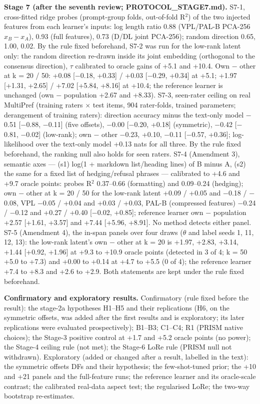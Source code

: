 \documentclass{article}
\begin{document}
\textbf{Stage 7 (after the seventh review; PROTOCOL\_STAGE7.md).} S7-1, cross-fitted ridge probes (prompt-group folds, out-of-fold R$^2$) of the two injected features from each learner's inputs: log length ratio 0.88 (VPL/PAL-B PCA-256 \(x_B - x_A\)), 0.93 (full features), 0.73 (D/DL joint PCA-256); random direction 0.65, 1.00, 0.02. By the rule fixed beforehand, S7-2 was run for the low-rank latent only: the random direction re-drawn inside its joint embedding (orthogonal to the consensus direction), $\tau$ calibrated to oracle gains of +5.1 and +10.4. Own $-$ other at k = 20 / 50: +0.08 {[}$-$0.18, +0.33{]} / +0.03 {[}$-$0.29, +0.34{]} at +5.1; +1.97 {[}+1.31, +2.65{]} / +7.02 {[}+5.84, +8.16{]} at +10.4; the reference learner is unchanged (own $-$ population +2.67 and +8.33). S7-3, seen-rater ceiling on real MultiPref (training raters $\times$ test items, 904 rater-folds, trained parameters; derangement of training raters): direction accuracy minus the text-only model $-$0.51 {[}$-$0.88, $-$0.11{]} (five offsets), $-$0.00 {[}$-$0.20, +0.18{]} (symmetric), $-$0.42 {[}$-$0.81, $-$0.02{]} (low-rank); own $-$ other $-$0.23, +0.10, $-$0.11 {[}$-$0.57, +0.36{]}; log-likelihood over the text-only model +0.13 nats for all three. By the rule fixed beforehand, the ranking null also holds for seen raters. S7-4 (Amendment 3), semantic axes --- (s1) log(1 + markdown list/heading lines) of B minus A, (s2) the same for a fixed list of hedging/refusal phrases --- calibrated to +4.6 and +9.7 oracle points: probes R$^2$ 0.37--0.66 (formatting) and 0.09--0.24 (hedging); own $-$ other at k = 20 / 50 for the low-rank latent +0.09 / +0.05 and $-$0.18 / $-$0.08, VPL $-$0.05 / +0.04 and +0.03 / +0.03, PAL-B (compressed features) $-$0.24 / $-$0.12 and +0.27 / +0.40 {[}$-$0.02, +0.85{]}; reference learner own $-$ population +2.57 {[}+1.61, +3.57{]} and +7.44 {[}+5.96, +8.91{]}. No method detects either panel. S7-5 (Amendment 4), the in-span panels over four draws ($\theta$ and label seeds 1, 11, 12, 13): the low-rank latent's own $-$ other at k = 20 is +1.97, +2.83, +3.14, +1.44 {[}+0.92, +1.96{]} at +9.3 to +10.9 oracle points (detected in 3 of 4; k = 50 +5.0 to +7.3) and +0.00 to +0.14 at +4.7 to +5.5 (0 of 4); the reference learner +7.4 to +8.3 and +2.6 to +2.9. Both statements are kept under the rule fixed beforehand.

\textbf{Confirmatory and exploratory results.} Confirmatory (rule fixed before the result): the stage-2a hypotheses H1--H5 and their replications (H6, on the symmetric offsets, was added after the first results and is exploratory; its later replications were evaluated prospectively); B1--B3; C1--C4; R1 (PRISM native choices); the Stage-3 positive control at +1.7 and +5.2 oracle points (no power); the Stage-4 ceiling rule (not met); the Stage-6 LoRe rule (PRISM null not withdrawn). Exploratory (added or changed after a result, labelled in the text): the symmetric offsets DFs and their hypothesis; the few-shot-tuned prior; the +10 and +21 panels and the full-feature runs; the reference learner and its oracle-scale contrast; the calibrated real-data aspect test; the regularised LoRe; the two-way bootstrap re-estimates.
\end{document}
